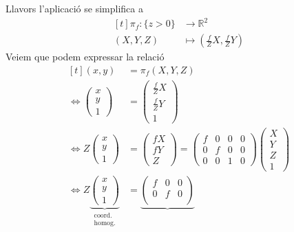 \documentclass[a4paper,12pt]{article}
\begin{document}
	Llavors l'aplicació se simplifica a
	\begin{displaymath}
		\begin{aligned}[t]
			\pi_f: \{z>0\} &\to \mathbb{R}^2\\
			(X, Y, Z) &\mapsto \left(\frac{f}{Z}X, \frac{f}{Z}Y\right)
		\end{aligned}
	\end{displaymath}
	Veiem que podem expressar la relació
	\begin{displaymath}
		\begin{aligned}[t]
			(x,y) &= \pi_f(X,Y,Z)\\
			\iff \begin{pmatrix}
				x\\y\\1
				\end{pmatrix} &= \begin{pmatrix}
				\frac{f}{Z}X\\\frac{f}{Z}Y\\1
				\end{pmatrix}\\
			\iff Z \begin{pmatrix}
				x\\y\\1
				\end{pmatrix} &= \begin{pmatrix}
				fX\\fY\\Z
				\end{pmatrix}
				= \begin{pmatrix}
				f & 0 & 0 & 0\\
				0 & f & 0 & 0\\
				0 & 0 & 1 & 0
				\end{pmatrix}
				\begin{pmatrix}
				X\\Y\\Z\\1
				\end{pmatrix}\\
			\iff Z \underbrace{\begin{pmatrix}
				x\\y\\1
				\end{pmatrix}}_{\substack{\text{coord.}\\ \text{homog.}}} &= \underbrace{\begin{pmatrix}
				f & 0 & 0\\
				0 & f & 0\\

\end{pmatrix}}
\end{aligned}
\end{displaymath}
\end{document}
